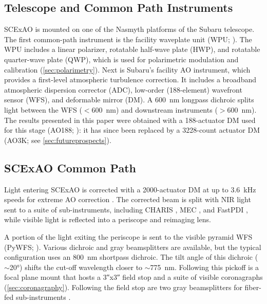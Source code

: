 \subsection{Telescope and Common Path Instruments}

SCExAO is mounted on one of the Nasmyth platforms of the Subaru telescope. The first common-path instrument is the facility waveplate unit (WPU; \citealp{watanabe_near-infrared_2018}). The WPU includes a linear polarizer, rotatable half-wave plate (HWP), and rotatable quarter-wave plate (QWP), which is used for polarimetric modulation and calibration (\autoref{sec:polarimetry}). Next is Subaru's facility AO instrument, which provides a first-level atmospheric turbulence correction. It includes a broadband atmospheric dispersion corrector (ADC), low-order (188-element) wavefront sensor (WFS), and deformable mirror (DM). A \SI{600}{\nano\meter} longpass dichroic splits light between the WFS ($<$\SI{600}{\nano\meter}) and downstream instruments ($>$\SI{600}{\nano\meter}). The results presented in this paper were obtained with a 188-actuator DM used for this stage (AO188; \citealp{minowa_performance_2010}): it has since been replaced by a 3228-count actuator DM (AO3K; see \autoref{sec:futureprospects}). 

\subsection{SCExAO Common Path}

Light entering SCExAO is corrected with a 2000-actuator DM at up to \SI{3.6}{\kilo\hertz} speeds for extreme AO correction \citep{lozi_new_2020,ahn_scexao_2021}. The corrected beam is split with NIR light sent to a suite of sub-instruments, including CHARIS \citep{groff_charis_2015}, MEC \citep{steiger_probing_2022}, and FastPDI \citep{lozi_status_2020}, while visible light is reflected into a periscope and reimaging lens.

A portion of the light exiting the periscope is sent to the visible pyramid WFS (PyWFS; \citealp{lozi_visible_2019}). Various dichroic and gray beamsplitters are available, but the typical configuration uses an \SI{800}{\nano\meter} shortpass dichroic. The tilt angle of this dichroic ($\sim$\ang{20}) shifts the cut-off wavelength closer to $\sim$\SI{775}{\nano\meter}. Following this pickoff is a focal plane mount that hosts a \ang{;;3}x\ang{;;3} field stop and a suite of visible coronagraphs (\autoref{sec:coronagraphy}). Following the field stop are two gray beamsplitters for fiber-fed sub-instruments \citep{vievard_single-aperture_2023,vievard_photonic_2023}.

